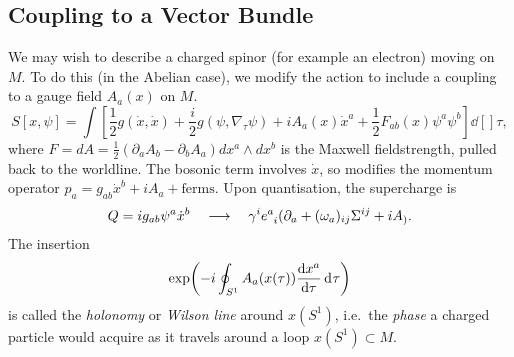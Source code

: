 \subsection{Coupling to a Vector Bundle}%
\label{sub:coupling_to_a_vector_bundle}

We may wish to describe a charged spinor (for example an electron) moving on $M$.
To do this (in the Abelian case), we modify the action to include a coupling to a gauge field $A_a (x)$ on $M$.
\begin{equation}
  S[x, \psi] = \int \left[ \frac{1}{2} g(\dot{x}, \dot{x}) + \frac{i}{2} g(\psi, \nabla_\tau \psi) + i A_a (x) \dot{x}^{a} + \frac{1}{2} F_{ab}(x) \psi^{a} \psi^{b} \right] \dd[]{\tau},
\end{equation}
where $F = dA = \frac{1}{2} (\partial_{a} A_b - \partial_{b} A_a) dx^{a} \wedge dx^{b}$ is the Maxwell fieldstrength, pulled back to the worldline.
The bosonic term involves $\dot{x}$, so modifies the momentum operator $p_{a} = g_{ab} \dot{x}^{b} + i A_a + \text{ferms}$.
Upon quantisation, the supercharge is
\begin{equation}
  Q = i g_{ab} \psi^{a} \dot{x}^{b} 
  \quad\longrightarrow \quad \gamma^{i} e\indices{^{a}_{i}} (\partial_{a} + (\omega_a)_{ij} \Sigma^{ij} + i A_).
\end{equation}
The insertion 
\begin{equation}
  \exp(-i \oint_{S^1} A_a(x (\tau)) \dv{x^{a}}{\tau} \dd[]{\tau})
\end{equation}
is called the \emph{holonomy} or \emph{Wilson line} around $x(S^1)$, i.e.~the \emph{phase} a charged particle would acquire as it travels around a loop $x(S^1) \subset M$.


